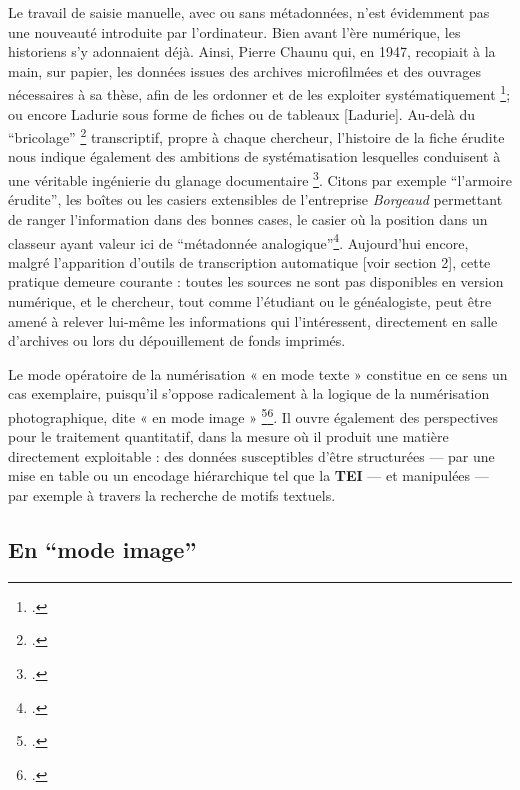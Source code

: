 Le travail de saisie manuelle, avec ou sans métadonnées, n’est évidemment pas une nouveauté introduite par l’ordinateur. Bien avant l’ère numérique, les historiens s’y adonnaient déjà. Ainsi, Pierre Chaunu qui, en 1947, recopiait à la main, sur papier, les données issues des archives microfilmées et des ouvrages nécessaires à sa thèse, afin de les ordonner et de les exploiter systématiquement \footcite[][]{muller}; ou encore Ladurie sous forme de fiches ou de tableaux [Ladurie]. Au-delà du \enquote{bricolage} \footcite[][]{levi-strauss} transcriptif, propre à chaque chercheur, l'histoire de la fiche érudite nous indique également des ambitions de systématisation lesquelles conduisent à une véritable ingénierie du glanage documentaire \footcite[][]{bert}. Citons par exemple \enquote{l'armoire érudite}, les boîtes ou les casiers extensibles de l'entreprise \emph{Borgeaud} permettant de ranger l'information dans des bonnes cases, le casier où la position dans un classeur ayant valeur ici de \enquote{métadonnée analogique}\footcite[][]{bert}. Aujourd’hui encore, malgré l’apparition d’outils de transcription automatique [voir section 2], cette pratique demeure courante : toutes les sources ne sont pas disponibles en version numérique, et le chercheur, tout comme l’étudiant ou le généalogiste, peut être amené à relever lui-même les informations qui l’intéressent, directement en salle d’archives ou lors du dépouillement de fonds imprimés. 

Le mode opératoire de la numérisation « en mode texte » constitue en ce sens un cas exemplaire, puisqu’il s’oppose radicalement à la logique de la numérisation photographique, dite « en mode image » \footcite[][]{bermesbook}\footcite[][]{claerr}. Il ouvre également des perspectives pour le traitement quantitatif, dans la mesure où il produit une matière directement exploitable : des données susceptibles d’être structurées — par une mise en table ou un encodage hiérarchique tel que la \textbf{TEI} — et manipulées — par exemple à travers la recherche de motifs textuels.

\subsection{En \enquote{mode image}}

